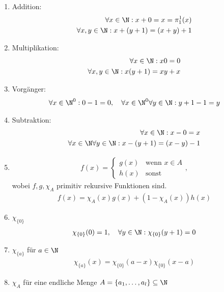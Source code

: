 
\begin{solution}
	\phantom{}
	\begin{enumerate}
		\item Addition: 
			\begin{align*}
			\forall x \in \N : x + 0 = x = \pi_1^1(x) \\
			\forall x, y \in \N : x + (y + 1) = (x + y) + 1
			\end{align*}
		\item Multiplikation:
			\begin{align*}
			\forall x \in \N : x0 = 0 \\
			\forall x,y \in \N: x(y+ 1) = xy + x
			\end{align*}
		\item Vorgänger:
			\begin{align*}
			 \forall x \in \N^0: 0 - 1 = 0, \quad \forall x \in \N^0 \forall y \in \N:  y + 1 - 1 = y
			\end{align*}
		\item Subtraktion:
			\begin{align*}
			\forall x \in \N: x - 0 = x \\
			\forall x \in \N \forall y \in \N: x - (y + 1) = (x - y) - 1
			\end{align*}
		\item 
			\begin{align*}
			f(x) = \begin{cases}
			g(x) & \text{wenn } x \in A \\
			h(x) & \text{sonst}
			\end{cases},
			\end{align*}
			wobei $f,g, \chi_A$ primitiv rekursive Funktionen sind.
			\begin{align*}
			f(x) = \chi_A(x) g(x) + (1 - \chi_A(x)) h(x)
			\end{align*}
		\item $\chi_{\{0\}}$
			\begin{align*}
			\chi_{\{0\}}(0) = 1, \quad \forall y \in \N: \chi_{\{0\}}(y + 1) = 0 
			\end{align*}
		\item $\chi_{\{a\}}$ für $a \in \N$
			\begin{align*}
			\chi_{\{a\}}(x) = \chi_{\{0\}}(a - x) \chi_{\{0\}}(x - a)
			\end{align*}
		\item $\chi_A$ für eine endliche Menge $A = \{a_1, \dots, a_l\} \subseteq \N$

\end{enumerate}
\end{solution}
